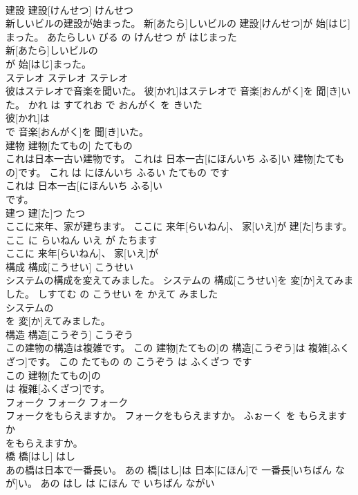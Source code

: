 \documentclass[8pt]{extreport}
\begin{document}
\begin{CJK}{UTF8}{min}
\\	建設	建設[けんせつ]	けんせつ	
\\	新しいビルの建設が始まった。	新[あたら]しいビルの 建設[けんせつ]が 始[はじ]まった。	あたらしい びる の けんせつ が はじまった	
\\	新[あたら]しいビルの
\\	が 始[はじ]まった。		
\\	ステレオ	ステレオ	ステレオ	
\\	彼はステレオで音楽を聞いた。	彼[かれ]はステレオで 音楽[おんがく]を 聞[き]いた。	かれ は すてれお で おんがく を きいた	
\\	彼[かれ]は
\\	で 音楽[おんがく]を 聞[き]いた。		
\\	建物	建物[たてもの]	たてもの	
\\	これは日本一古い建物です。	これは 日本一古[にほんいち ふる]い 建物[たてもの]です。	これ は にほんいち ふるい たてもの です	
\\	これは 日本一古[にほんいち ふる]い
\\	です。		
\\	建つ	建[た]つ	たつ	
\\	ここに来年、家が建ちます。	ここに 来年[らいねん]、 家[いえ]が 建[た]ちます。	ここ に らいねん いえ が たちます	
\\	ここに 来年[らいねん]、 家[いえ]が
\\	構成	構成[こうせい]	こうせい	
\\	システムの構成を変えてみました。	システムの 構成[こうせい]を 変[か]えてみました。	しすてむ の こうせい を かえて みました	
\\	システムの
\\	を 変[か]えてみました。		
\\	構造	構造[こうぞう]	こうぞう	
\\	この建物の構造は複雑です。	この 建物[たてもの]の 構造[こうぞう]は 複雑[ふくざつ]です。	この たてもの の こうぞう は ふくざつ です	
\\	この 建物[たてもの]の
\\	は 複雑[ふくざつ]です。		
\\	フォーク	フォーク	フォーク	
\\	フォークをもらえますか。	フォークをもらえますか。	ふぉーく を もらえます か	
\\	をもらえますか。		
\\	橋	橋[はし]	はし	
\\	あの橋は日本で一番長い。	あの 橋[はし]は 日本[にほん]で 一番長[いちばん なが]い。	あの はし は にほん で いちばん ながい	

\end{CJK}
\end{document}
